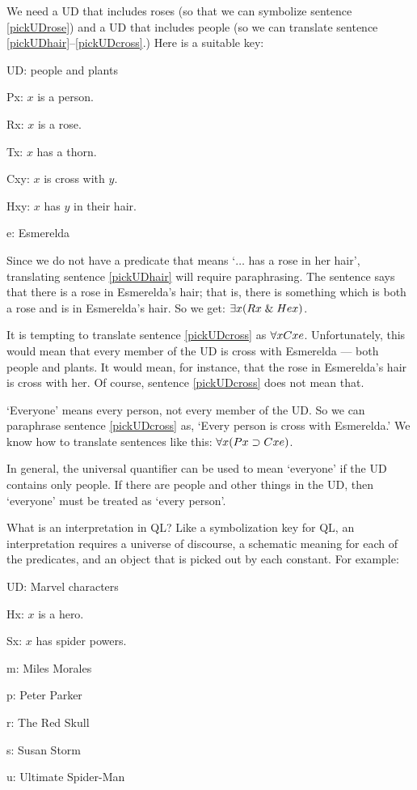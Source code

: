 We need a UD that includes roses (so that we can symbolize sentence \ref{pickUDrose}) and a UD that includes people (so we can translate sentence \ref{pickUDhair}--\ref{pickUDcross}.) Here is a suitable key:
\begin{ekey}
\item[UD:] people and plants
\item[Px:] $x$ is a person.
\item[Rx:] $x$ is a rose.
\item[Tx:] $x$ has a thorn.
\item[Cxy:] $x$ is cross with $y$.
\item[Hxy:] $x$ has $y$ in their hair.
\item[e:] Esmerelda
\end{ekey}

Since we do not have a predicate that means `$\ldots$ has a rose in her hair', translating sentence \ref{pickUDhair} will require paraphrasing. The sentence says that there is a rose in Esmerelda's hair; that is, there is something which is both a rose and is in Esmerelda's hair. So we get: $\exists x(Rx \mathrel\& Hex)$.

It is tempting to translate sentence \ref{pickUDcross} as $\forall x Cxe$. Unfortunately, this would mean that every member of the UD is cross with Esmerelda --- both people and plants. It would mean, for instance, that the rose in Esmerelda's hair is cross with her. Of course, sentence \ref{pickUDcross} does not mean that.

`Everyone' means every person, not every member of the UD. So we can paraphrase sentence \ref{pickUDcross} as, `Every person is cross with Esmerelda.' We know how to translate sentences like this: $\forall x(Px \supset Cxe)$.

In general, the universal quantifier can be used to mean `everyone' if the UD contains only people. If there are people and other things in the UD, then `everyone' must be treated as `every person'.








What is an interpretation in QL? Like a symbolization key for QL, an interpretation requires a universe of discourse, a schematic meaning for each of the predicates, and an object that is picked out by each constant. For example:

\begin{ekey}
\item[UD:] Marvel characters
\item[Hx:] $x$ is a hero.
\item[Sx:] $x$ has spider powers.
\item[m:] Miles Morales
\item[p:] Peter Parker
\item[r:] The Red Skull
\item[s:] Susan Storm
\item[u:] Ultimate Spider-Man
\end{ekey}


